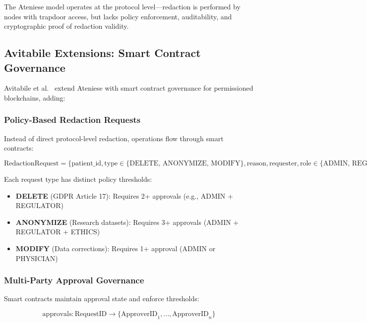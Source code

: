 The Ateniese model operates at the protocol level---redaction is performed by nodes with trapdoor access, but lacks policy enforcement, auditability, and cryptographic proof of redaction validity.

\subsection{Avitabile Extensions: Smart Contract Governance}

Avitabile et al.~\cite{avitabile2024data} extend Ateniese with smart contract governance for permissioned blockchains, adding:

\subsubsection{Policy-Based Redaction Requests}

Instead of direct protocol-level redaction, operations flow through smart contracts:

\begin{equation}
    \text{RedactionRequest} = \{
        \text{patient\_id},
        \text{type} \in \{\text{DELETE, ANONYMIZE, MODIFY}\},
        \text{reason},
        \text{requester},
        \text{role} \in \{\text{ADMIN, REGULATOR, PHYSICIAN, RESEARCHER}\}
    \}
\end{equation}

Each request type has distinct policy thresholds:
\begin{itemize}
    \item \textbf{DELETE} (GDPR Article 17): Requires 2+ approvals (e.g., ADMIN + REGULATOR)
    \item \textbf{ANONYMIZE} (Research datasets): Requires 3+ approvals (ADMIN + REGULATOR + ETHICS)
    \item \textbf{MODIFY} (Data corrections): Requires 1+ approval (ADMIN or PHYSICIAN)
\end{itemize}

\subsubsection{Multi-Party Approval Governance}

Smart contracts maintain approval state and enforce thresholds:

\begin{equation}
    \text{approvals}: \text{RequestID} \to \{\text{ApproverID}_1, \ldots, \text{ApproverID}_n\}
\end{equation}


